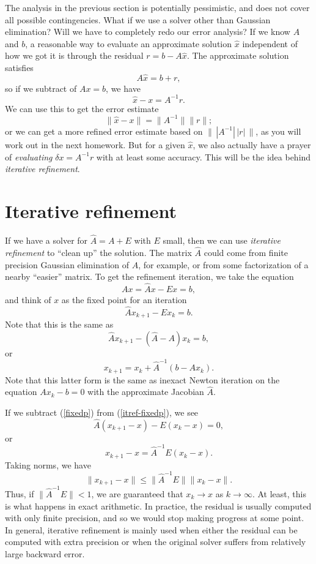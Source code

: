 \documentclass[12pt, leqno]{article}
\begin{document}
The analysis in the previous section is potentially pessimistic, and
does not cover all possible contingencies.  What if we use a solver
other than Gaussian elimination?  Will we have to completely redo our
error analysis?  If we know $A$ and $b$, a reasonable way to evaluate
an approximate solution $\hat{x}$ independent of how we got it is
through the residual $r = b-A\hat{x}$.  The approximate solution
satisfies
\[
  A \hat{x} = b + r,
\]
so if we subtract of $Ax = b$, we have
\[
  \hat{x}-x = A^{-1} r.
\]
We can use this to get the error estimate
\[
  \|\hat{x}-x\| = \|A^{-1}\| \|r\|;
\]
or we can get a more refined error estimate based on $\| \, |A^{-1}|
\, |r| \, \|$, as you will work out in the next homework.  But for a
given $\hat{x}$, we also actually have a prayer of {\em evaluating}
$\delta x = A^{-1} r$ with at least some accuracy.  This will be the
idea behind {\em iterative refinement}.

\section{Iterative refinement}

If we have a solver for $\hat{A} = A + E$ with $E$ small, then we can
use {\em iterative refinement} to ``clean up'' the solution.  The
matrix $\hat{A}$ could come from finite precision Gaussian elimination
of $A$, for example, or from some factorization of a nearby ``easier''
matrix.  To get the refinement iteration, we take the equation
\begin{equation} \label{fixedp}
  Ax = \hat{A}x-Ex = b,
\end{equation}
and think of $x$ as the fixed point for an iteration
\begin{equation} \label{itref-fixedp}
  \hat{A} x_{k+1} - E x_k = b.
\end{equation}
Note that this is the same as
\[
  \hat{A} x_{k+1} - (\hat{A} - A) x_k = b,
\]
or
\[
  x_{k+1} = x_k + \hat{A}^{-1} (b - A x_{k}).
\]
Note that this latter form is the same as inexact Newton iteration on
the equation $A x_{k} - b = 0$ with the approximate Jacobian $\hat{A}$.

If we subtract (\ref{fixedp}) from (\ref{itref-fixedp}), we see
\[
  \hat{A}(x_{k+1}-x) - E(x_k-x) = 0,
\]
or
\[
  x_{k+1}-x = \hat{A}^{-1} E (x_k-x).
\]
Taking norms, we have
\[
  \|x_{k+1}-x\| \leq \|\hat{A}^{-1} E\| \|x_k-x\|.
\]
Thus, if $\|\hat{A}^{-1} E\| < 1$, we are guaranteed that $x_{k} \rightarrow x$
as $k \rightarrow \infty$.  At least, this is what happens in exact arithmetic.
In practice, the residual is usually computed with only finite precision,
and so we would stop making progress at some point.  In general,
iterative refinement is mainly used when either the residual can be
computed with extra precision or when the original solver suffers from
relatively large backward error.
\end{document}

